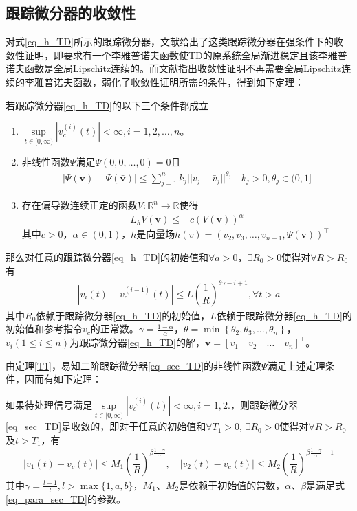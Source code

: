 \subsection{跟踪微分器的收敛性}
对式\eqref{eq_h_TD}所示的跟踪微分器，文献\parencite{Wang_2007}给出了这类跟踪微分器在强条件下的收敛性证明，即要求有一个李雅普诺夫函数使TD的原系统全局渐进稳定且该李雅普诺夫函数是全局Lipschitz连续的。而文献\parencite{Guo_2011b}指出收敛性证明不再需要全局Lipschitz连续的李雅普诺夫函数，弱化了收敛性证明所需的条件，得到如下定理：
\begin{theorem}
	若跟踪微分器\eqref{eq_h_TD}的以下三个条件都成立
	\begin{enumerate}
		\item $ \sup\limits_{t \in[0, \infty ) }\left|v^{(i)}_c(t)\right|<\infty, i=1,2,\ldots,n$。
		\item 非线性函数$ \Psi $满足$ \Psi(0,0,\ldots,0)=0$且
		\begin{align}
		|\Psi(\bm{v})-\Psi(\bar{\bm{v}})| \leq \sum_{j=1}^{n} k_{j}|| v_{j}-\bar{v}_{j}||^{\theta_{j}} \quad k_{j}>0, \theta_{j} \in(0,1]
		\end{align}
		\item 存在偏导数连续正定的函数$ V :\mathbb{R}^{n} \rightarrow \mathbb{R}$使得
		\begin{align}L_{h} V(\bm{v}) \leq-c(V(\bm{v}))^{\alpha}\end{align}
		其中$ c>0 $，$ \alpha \in (0,1) $，$ h $是向量场$h(v)=\left(v_{2}, v_{3}, \ldots, v_{n-1}, \Psi(\bm{v})\right)^{\top}$
	\end{enumerate}
	那么对任意的跟踪微分器\eqref{eq_h_TD}的初始值和$ \forall a>0 $，$ \exists R_0 >0  $使得对$ \forall R>R_0 $有
	\begin{align}
	\left|v_{i}(t)-v^{(i-1)}_c(t)\right| \leq L\left(\dfrac{1}{R}\right)^{\theta \gamma-i+1}, \forall t>a
	\end{align}
	其中$ R_0 $依赖于跟踪微分器\eqref{eq_h_TD}的初始值，$ L $依赖于跟踪微分器\eqref{eq_h_TD}的初始值和参考指令$ v_c $的正常数。$ \gamma = \frac{1-\alpha}{\alpha} $，$\theta=\min \left\{\theta_{2}, \theta_{3}, \ldots, \theta_{n}\right\}$，$v_{i}(1 \leq i \leq n)$为跟踪微分器\eqref{eq_h_TD}的解，$ \bm{v}=\left[ v_1 \quad v_2 \quad \ldots \quad v_n\right]^\top  $。	\label{T1}
\end{theorem}

由定理\ref{T1}，易知二阶跟踪微分器\eqref{eq_sec_TD}的非线性函数$ \Psi$满足上述定理条件，因而有如下定理：
\begin{theorem}
如果待处理信号满足$ \sup\limits_{t \in[0, \infty ) }\left|v^{(i)}_c(t)\right|<\infty, i=1,2. $，则跟踪微分器\eqref{eq_sec_TD}是收敛的，即对于任意的初始值和$\forall T_1 >0 $, $\exists R_0 >0 $使得对$\forall R>R_0 $及$ t>T_1 $，有
\begin{align}
\left|v_{1}(t)-v_c(t)\right| \leq M_{1}\left(\dfrac{1}{R}\right)^{\beta {\frac{1-\gamma}{\gamma}}}, \quad\left|v_{2}(t)-\dot{v}_c(t)\right| \leq M_{2}\left(\dfrac{1}{R}\right)^{\beta \frac{1-\gamma}{\gamma}-1}
\end{align}
其中$\gamma=\frac{l-1}{l}, l>\max \{1, a, b\}$，$ M_1 $、$M_2$是依赖于初始值的常数，$ \alpha $、$\beta$是满足式\eqref{eq_para_sec_TD}的参数。		\label{the_sec_TD}
\end{theorem}

